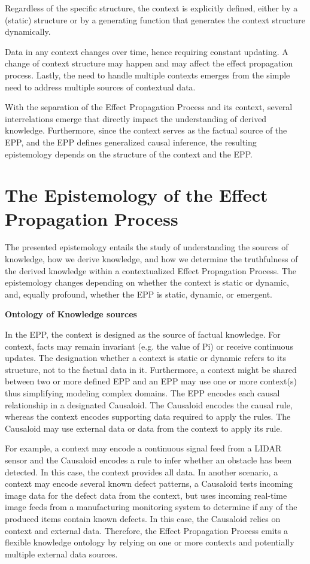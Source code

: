 \documentclass{article}
\begin{document}
Regardless of the specific structure, the context is explicitly defined, either by a (static) structure or by a generating function that generates the context structure dynamically.

Data in any context changes over time, hence requiring constant updating. A change of context structure may happen and may affect the effect propagation process. Lastly, the need to handle multiple contexts emerges from the simple need to address multiple sources of contextual data.

With the separation of the Effect Propagation Process and its context, several interrelations emerge that directly impact the understanding of derived knowledge. Furthermore, since the context serves as the factual source of the EPP, and the EPP defines generalized causal inference, the resulting epistemology depends on the structure of the context and the EPP.


\section{The Epistemology of the Effect Propagation Process}
\label{sec:Epistemology}

The presented epistemology entails the study of understanding the sources of knowledge, how we derive knowledge, and how we determine the truthfulness of the derived knowledge within a contextualized Effect Propagation Process. The epistemology changes depending on whether the context is static or dynamic, and, equally profound, whether the EPP is static, dynamic, or emergent.

\textbf{Ontology of Knowledge sources}

In the EPP, the context is designed as the source of factual knowledge. For context, facts may remain invariant (e.g. the value of Pi) or receive continuous updates. The designation whether a context is static or dynamic refers to its structure, not to the factual data in it. Furthermore, a context might be shared between two or more defined EPP and an EPP may use one or more context(s) thus simplifying modeling complex domains.
The EPP encodes each causal relationship in a designated Causaloid. The Causaloid encodes the causal rule, whereas the context encodes supporting data required to apply the rules. The Causaloid may use external data or data from the context to apply its rule.

For example, a context may encode a continuous signal feed from a LIDAR sensor and the Causaloid encodes a rule to infer whether an obstacle has been detected. In this case, the context provides all data. In another scenario, a context may encode several known defect patterns, a Causaloid tests incoming image data for the defect data from the context, but uses incoming real-time image feeds from a manufacturing monitoring system to determine if any of the produced items contain known defects. In this case, the Causaloid relies on context and external data. Therefore, the Effect Propagation Process emits a flexible knowledge ontology by relying on one or more contexts and potentially multiple external data sources.
\end{document}
